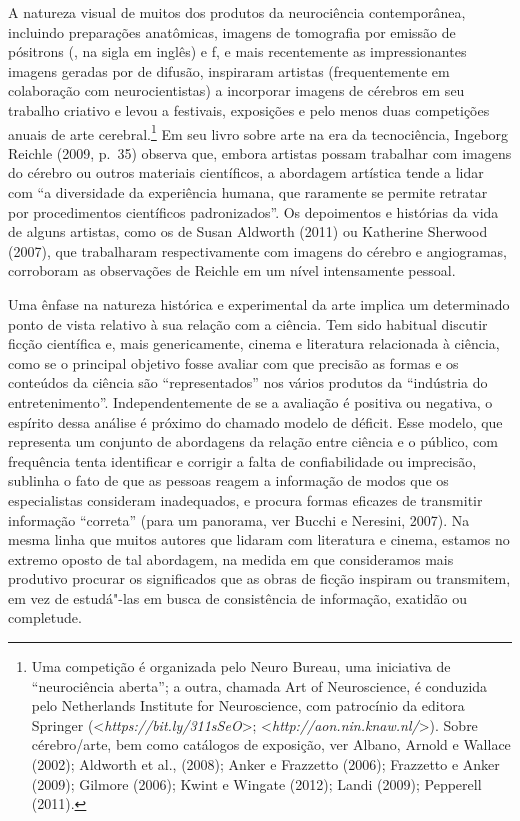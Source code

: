 A natureza visual de muitos dos produtos da neurociência contemporânea,
incluindo preparações anatômicas, imagens de tomografia por emissão de
pósitrons (, na sigla em inglês) e f, e mais recentemente as
impressionantes imagens geradas por  de difusão, inspiraram artistas
(frequentemente em colaboração com neurocientistas) a incorporar imagens
de cérebros em seu trabalho criativo e levou a festivais, exposições e
pelo menos duas competições anuais de arte cerebral.\footnote[1]{Uma competição é organizada pelo Neuro Bureau, uma iniciativa de
``neurociência aberta''; a outra, chamada Art of Neuroscience, é
conduzida pelo Netherlands Institute for Neuroscience, com patrocínio da
editora Springer
(\textless{}\emph{https://bit.ly/311sSeO}\textgreater{};
\textless{}\emph{http://aon.nin.knaw.nl/}\textgreater{}). Sobre cérebro/arte, bem como catálogos
de exposição, ver Albano, Arnold e Wallace (2002); Aldworth et al.,
(2008); Anker e Frazzetto (2006); Frazzetto e Anker (2009); Gilmore
(2006); Kwint e Wingate (2012); Landi (2009); Pepperell (2011).}
Em seu livro sobre arte na era da tecnociência, Ingeborg Reichle (2009,
p.~35) observa que, embora artistas possam trabalhar com imagens do
cérebro ou outros materiais científicos, a abordagem artística tende a
lidar com ``a diversidade da experiência humana, que raramente se
permite retratar por procedimentos científicos padronizados''. Os
depoimentos e histórias da vida de alguns artistas, como os de Susan
Aldworth (2011) ou Katherine Sherwood (2007), que trabalharam
respectivamente com imagens do cérebro e angiogramas, corroboram as
observações de Reichle em um nível intensamente pessoal.

Uma ênfase na natureza histórica e experimental da arte implica um
determinado ponto de vista relativo à sua relação com a ciência. Tem
sido habitual discutir ficção científica e, mais genericamente, cinema e
literatura relacionada à ciência, como se o principal objetivo fosse
avaliar com que precisão as formas e os conteúdos da ciência são
``representados'' nos vários produtos da ``indústria do
entretenimento''. Independentemente de se a avaliação é positiva ou
negativa, o espírito dessa análise é próximo do chamado modelo de
déficit. Esse modelo, que representa um conjunto de abordagens da
relação entre ciência e o público, com frequência tenta identificar e
corrigir a falta de confiabilidade ou imprecisão, sublinha o fato de que
as pessoas reagem a informação de modos que os especialistas consideram
inadequados, e procura formas eficazes de transmitir informação
``correta'' (para um panorama, ver Bucchi e Neresini, 2007). Na mesma
linha que muitos autores que lidaram com literatura e cinema, estamos no
extremo oposto de tal abordagem, na medida em que consideramos mais
produtivo procurar os significados que as obras de ficção inspiram ou
transmitem, em vez de estudá"-las em busca de consistência de informação,
exatidão ou completude.

